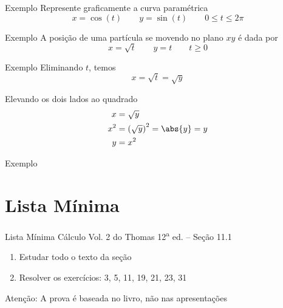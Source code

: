 \addtocounter{exemplo}{1}
\begin{frame}{Exemplo \theexemplo}
  Represente graficamente a curva paramétrica
  \[
    x = \cos(t)         \qquad
    y = \sin(t)         \qquad
    0 \leq t \leq 2\pi
  \]
\end{frame}


\addtocounter{exemplo}{1}
\begin{frame}{Exemplo \theexemplo}
  A posição de uma partícula se movendo no plano $xy$ é dada por
  \[
    x = \sqrt{t}  \qquad
    y = t         \qquad
    t \geq 0
  \]
\end{frame}

\begin{frame}{Exemplo \theexemplo}
  Eliminando $t$, temos
  \[
    x
    = \sqrt{t}
    = \sqrt{y}
  \]

  Elevando os dois lados ao quadrado
  \begin{align*}
    x   & = \sqrt{y}                \\
    x^2 & = \left(\sqrt{y}\right)^2
          = \abs{y}
          = y                       \\
    y   & = x^2
  \end{align*}
\end{frame}


\addtocounter{exemplo}{1}
\begin{frame}{Exemplo \theexemplo}
\end{frame}

\section{Lista Mínima}

\begin{frame}{Lista Mínima}
  Cálculo Vol. 2 do Thomas 12\textsuperscript{a} ed. -- Seção 11.1
  \begin{enumerate}
    \item Estudar todo o texto da seção
    \item Resolver os exercícios: 3, 5, 11, 19, 21, 23, 31
  \end{enumerate}

  \vfill
  Atenção: A prova é baseada no livro, não nas apresentações
\end{frame}


